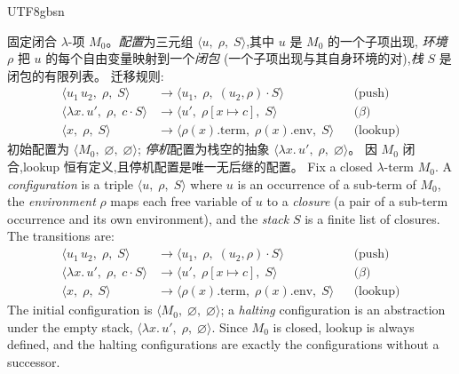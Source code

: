 \begin{CJK*}{UTF8}{gbsn}
\begin{definition}\label{def:krivine}
  \ifPaperChinese
  固定闭合 $\lambda$-项 $M_0$。\emph{配置}为三元组
  $\langle u,\; \rho,\; S \rangle$,其中 $u$ 是 $M_0$ 的一个子项出现,
  \emph{环境} $\rho$ 把 $u$ 的每个自由变量映射到一个\emph{闭包}
  (一个子项出现与其自身环境的对),\emph{栈} $S$ 是闭包的有限列表。
  迁移规则:
  \begin{align*}
    \langle u_1\, u_2,\; \rho,\; S \rangle
      &\longrightarrow \langle u_1,\; \rho,\; (u_2, \rho) \cdot S \rangle
      && \text{(push)} \\
    \langle \lambda x.\, u',\; \rho,\; c \cdot S \rangle
      &\longrightarrow \langle u',\; \rho[x \mapsto c],\; S \rangle
      && \text{($\beta$)} \\
    \langle x,\; \rho,\; S \rangle
      &\longrightarrow \langle \rho(x).\mathrm{term},\; \rho(x).\mathrm{env},\; S \rangle
      && \text{(lookup)}
  \end{align*}
  初始配置为 $\langle M_0,\; \varnothing,\; \varnothing \rangle$;
  \emph{停机}配置为栈空的抽象 $\langle \lambda x.\, u',\; \rho,\; \varnothing \rangle$。
  因 $M_0$ 闭合,lookup 恒有定义,且停机配置是唯一无后继的配置。
  \else
  Fix a closed $\lambda$-term $M_0$. A \emph{configuration} is a
  triple $\langle u,\; \rho,\; S \rangle$ where $u$ is an occurrence
  of a sub-term of $M_0$, the \emph{environment} $\rho$ maps each free
  variable of $u$ to a \emph{closure} (a pair of a sub-term occurrence
  and its own environment), and the \emph{stack} $S$ is a finite list
  of closures. The transitions are:
  \begin{align*}
    \langle u_1\, u_2,\; \rho,\; S \rangle
      &\longrightarrow \langle u_1,\; \rho,\; (u_2, \rho) \cdot S \rangle
      && \text{(push)} \\
    \langle \lambda x.\, u',\; \rho,\; c \cdot S \rangle
      &\longrightarrow \langle u',\; \rho[x \mapsto c],\; S \rangle
      && \text{($\beta$)} \\
    \langle x,\; \rho,\; S \rangle
      &\longrightarrow \langle \rho(x).\mathrm{term},\; \rho(x).\mathrm{env},\; S \rangle
      && \text{(lookup)}
  \end{align*}
  The initial configuration is
  $\langle M_0,\; \varnothing,\; \varnothing \rangle$; a \emph{halting}
  configuration is an abstraction under the empty stack,
  $\langle \lambda x.\, u',\; \rho,\; \varnothing \rangle$. Since
  $M_0$ is closed, lookup is always defined, and the halting
  configurations are exactly the configurations without a successor.
  \fi
\end{definition}


\end{CJK*}
